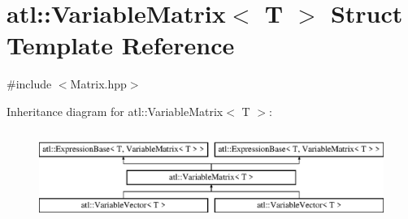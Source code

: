 \hypertarget{structatl_1_1_variable_matrix}{\section{atl\+:\+:Variable\+Matrix$<$ T $>$ Struct Template Reference}
\label{structatl_1_1_variable_matrix}
}


{\ttfamily \#include $<$Matrix.\+hpp$>$}

Inheritance diagram for atl\+:\+:Variable\+Matrix$<$ T $>$\+:\begin{figure}[H]
\begin{center}
\leavevmode
\includegraphics[height=2.968198cm]{structatl_1_1_variable_matrix}
\end{center}
\end{figure}

